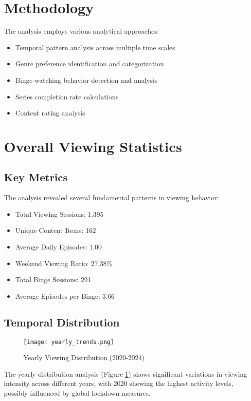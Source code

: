 \documentclass[12pt]{article}
\begin{document}
\section{Methodology}
The analysis employs various analytical approaches:
\begin{itemize}
    \item Temporal pattern analysis across multiple time scales
    \item Genre preference identification and categorization
    \item Binge-watching behavior detection and analysis
    \item Series completion rate calculations
    \item Content rating analysis
\end{itemize}

\section{Overall Viewing Statistics}
\subsection{Key Metrics}
The analysis revealed several fundamental patterns in viewing behavior:
\begin{itemize}
    \item Total Viewing Sessions: 1,395
    \item Unique Content Items: 162
    \item Average Daily Episodes: 1.00
    \item Weekend Viewing Ratio: 27.38\%
    \item Total Binge Sessions: 291
    \item Average Episodes per Binge: 3.66
\end{itemize}

\subsection{Temporal Distribution}
\begin{figure}[H]
\centering
\texttt{[image: yearly\_trends.png]}
\caption{Yearly Viewing Distribution (2020-2024)}
\label{fig:yearly_trends}
\end{figure}

The yearly distribution analysis (Figure \ref{fig:yearly_trends}) shows significant variations in viewing intensity across different years, with 2020 showing the highest activity levels, possibly influenced by global lockdown measures.
\end{document}
